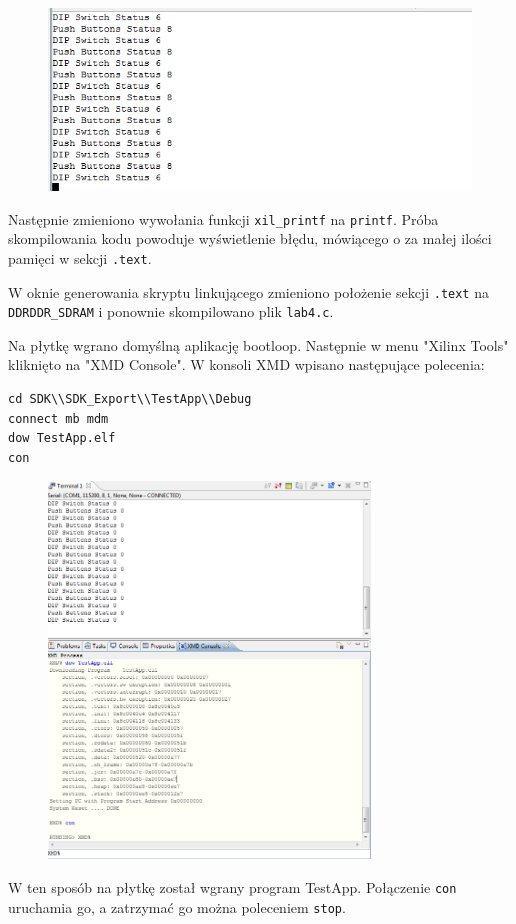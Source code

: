 \begin{figure}[h]
	\centering
	\includegraphics{img/putty-dziala.PNG}
	\label{img:putty-dziala}
\end{figure}

Następnie zmieniono wywołania funkcji \verb`xil_printf` na \verb`printf`. Próba skompilowania kodu
powoduje wyświetlenie błędu, mówiącego o za małej ilości pamięci w sekcji \verb`.text`.

W oknie generowania skryptu linkującego zmieniono położenie sekcji \verb`.text` na
\verb`DDRDDR_SDRAM` i ponownie skompilowano plik \verb`lab4.c`.

Na płytkę wgrano domyślną aplikację bootloop. Następnie w menu "Xilinx Tools" kliknięto na "XMD
Console". W konsoli XMD wpisano następujące polecenia:
\begin{lstlisting}
cd SDK\\SDK_Export\\TestApp\\Debug
connect mb mdm
dow TestApp.elf
con
\end{lstlisting}

\newpage

\begin{figure}[h]
	\centering
	\includegraphics[height=10cm]{img/dziala.PNG}
	\label{fig:dziala}
\end{figure}

W ten sposób na płytkę został wgrany program TestApp. Połączenie \verb`con` uruchamia go, a
zatrzymać go można poleceniem \verb`stop`.
